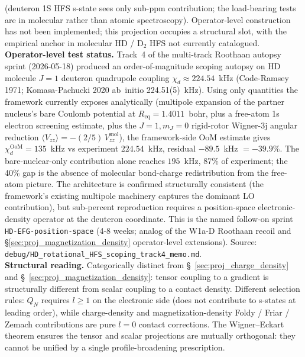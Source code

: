 \documentclass[11pt]{article}
\begin{document}
(deuteron 1S HFS s-state sees only sub-ppm contribution; the
load-bearing tests are in molecular rather than atomic
spectroscopy).  Operator-level construction has not been
implemented; this projection occupies a structural slot, with the
empirical anchor in molecular HD / D$_2$ HFS not currently
catalogued.\\
\textbf{Operator-level test status.}  Track~4 of the multi-track
Roothaan autopsy sprint (2026-05-18) produced an order-of-magnitude
scoping autopsy on HD molecule $J=1$ deuteron quadrupole coupling
$\chi_d \approx 224.54$~kHz (Code-Ramsey 1971; Komasa-Pachucki
2020 ab~initio 224.51(5)~kHz).  Using only quantities the
framework currently exposes analytically (multipole expansion of
the partner nucleus's bare Coulomb potential at $R_\text{eq} =
1.4011$~bohr, plus a free-atom 1s electron screening estimate,
plus the $J=1, m_J=0$ rigid-rotor Wigner-3j angular reduction
$\langle V_{zz}\rangle = -(2/5)\,V_{zz}^\text{mol}$), the
framework-side OoM estimate gives $\chi_d^\text{OoM} = 135$~kHz
vs experiment $224.54$~kHz, residual $-89.5$~kHz $= -39.9\%$.
The bare-nuclear-only contribution alone reaches $195$~kHz, 87\%
of experiment; the 40\% gap is the absence of molecular bond-charge
redistribution from the free-atom picture.  The architecture is
confirmed structurally consistent (the framework's existing
multipole machinery captures the dominant LO contribution), but
sub-percent reproduction requires a position-space electronic-density
operator at the deuteron coordinate.  This is the named follow-on
sprint \texttt{HD-EFG-position-space} (4-8 weeks; analog of the
W1a-D Roothaan recoil and \S\ref{sec:proj_magnetization_density}
operator-level extensions).  Source: \texttt{debug/HD\_rotational\_HFS\_scoping\_track4\_memo.md}.\\
\textbf{Structural reading.}  Categorically distinct from
\S~\ref{sec:proj_charge_density} and
\S~\ref{sec:proj_magnetization_density}: tensor coupling to a
gradient is structurally different from scalar coupling to a contact
density.  Different selection rules: $Q_N$ requires $l\geq 1$ on the
electronic side (does not contribute to s-states at leading order),
while charge-density and magnetization-density Foldy / Friar / Zemach
contributions are pure $l=0$ contact corrections.  The
Wigner--Eckart theorem ensures the tensor and scalar projections
are mutually orthogonal: they cannot be unified by a single
profile-broadening prescription.
\end{document}
